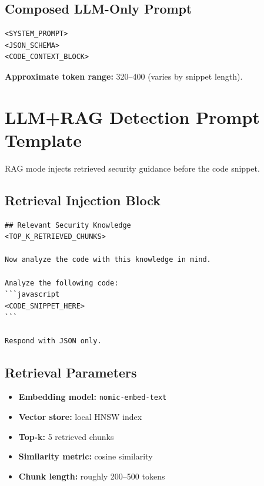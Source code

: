 \subsection{Composed LLM-Only Prompt}
\begin{lstlisting}[basicstyle=\footnotesize\ttfamily, breaklines=true, frame=single, caption={Composed LLM-only prompt}, label={lst:complete-llm-prompt}]
<SYSTEM_PROMPT>
<JSON_SCHEMA>
<CODE_CONTEXT_BLOCK>
\end{lstlisting}

\textbf{Approximate token range:} 320--400 (varies by snippet length).

\section{LLM+RAG Detection Prompt Template}
\label{sec:prompt-rag}

RAG mode injects retrieved security guidance before the code snippet.

\subsection{Retrieval Injection Block}
\begin{lstlisting}[basicstyle=\small\ttfamily, breaklines=true, frame=single, caption={RAG knowledge injection}, label={lst:rag-injection}]
## Relevant Security Knowledge
<TOP_K_RETRIEVED_CHUNKS>

Now analyze the code with this knowledge in mind.

Analyze the following code:
```javascript
<CODE_SNIPPET_HERE>
```

Respond with JSON only.
\end{lstlisting}

\subsection{Retrieval Parameters}
\begin{itemize}
  \item \textbf{Embedding model:} \texttt{nomic-embed-text}
  \item \textbf{Vector store:} local HNSW index
  \item \textbf{Top-k:} 5 retrieved chunks
  \item \textbf{Similarity metric:} cosine similarity
  \item \textbf{Chunk length:} roughly 200--500 tokens
\end{itemize}


